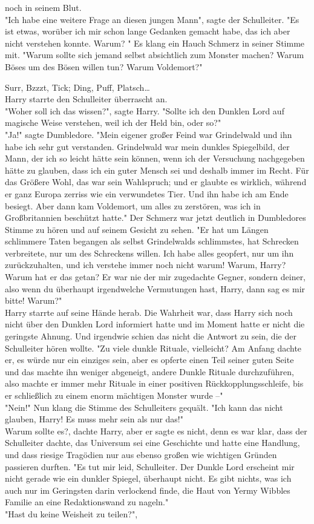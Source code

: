 {noch in seinem Blut.\\ "Ich habe eine weitere Frage an diesen jungen Mann", sagte der Schulleiter. "Es ist etwas, worüber ich mir schon lange Gedanken gemacht habe, das ich aber nicht verstehen konnte. Warum? " Es klang ein Hauch Schmerz in seiner Stimme mit. "Warum sollte sich jemand selbst absichtlich zum Monster machen? Warum Böses um des Bösen willen tun? Warum Voldemort?"

Surr, Bzzzt, Tick; Ding, Puff, Platsch…\\ Harry starrte den Schulleiter überrascht an.\\ "Woher soll ich das wissen?", sagte Harry. "Sollte ich den Dunklen Lord auf magische Weise verstehen, weil ich der Held bin, oder so?"\\ "Ja!" sagte Dumbledore. "Mein eigener großer Feind war Grindelwald und ihn habe ich sehr gut verstanden. Grindelwald war mein dunkles Spiegelbild, der Mann, der ich so leicht hätte sein können, wenn ich der Versuchung nachgegeben hätte zu glauben, dass ich ein guter Mensch sei und deshalb immer im Recht. Für das Größere Wohl, das war sein Wahlspruch; und er glaubte es wirklich, während er ganz Europa zerriss wie ein verwundetes Tier. Und ihn habe ich am Ende besiegt. Aber dann kam Voldemort, um alles zu zerstören, was ich in Großbritannien beschützt hatte." Der Schmerz war jetzt deutlich in Dumbledores Stimme zu hören und auf seinem Gesicht zu sehen. "Er hat um Längen schlimmere Taten begangen als selbst Grindelwalds schlimmstes, hat Schrecken verbreitete, nur um des Schreckens willen. Ich habe alles geopfert, nur um ihn zurückzuhalten, und ich verstehe immer noch nicht warum! Warum, Harry? Warum hat er das getan? Er war nie der mir zugedachte Gegner, sondern deiner, also wenn du überhaupt irgendwelche Vermutungen hast, Harry, dann sag es mir bitte! Warum?"\\ Harry starrte auf seine Hände herab. Die Wahrheit war, dass Harry sich noch nicht über den Dunklen Lord informiert hatte und im Moment hatte er nicht die geringste Ahnung. Und irgendwie schien das nicht die Antwort zu sein, die der Schulleiter hören wollte. "Zu viele dunkle Rituale, vielleicht? Am Anfang dachte er, es würde nur ein einziges sein, aber es opferte einen Teil seiner guten Seite und das machte ihn weniger abgeneigt, andere Dunkle Rituale durchzuführen, also machte er immer mehr Rituale in einer positiven Rückkopplungsschleife, bis er schließlich zu einem enorm mächtigen Monster wurde --"\\ "Nein!" Nun klang die Stimme des Schulleiters gequält. "Ich kann das nicht glauben, Harry! Es muss mehr sein als nur das!"\\ Warum sollte es?, dachte Harry, aber er sagte es nicht, denn es war klar, dass der Schulleiter dachte, das Universum sei eine Geschichte und hatte eine Handlung, und dass riesige Tragödien nur aus ebenso großen wie wichtigen Gründen passieren durften. "Es tut mir leid, Schulleiter. Der Dunkle Lord erscheint mir nicht gerade wie ein dunkler Spiegel, überhaupt nicht. Es gibt nichts, was ich auch nur im Geringsten darin verlockend finde, die Haut von Yermy Wibbles Familie an eine Redaktionswand zu nageln."\\ "Hast du keine Weisheit zu teilen?", }
